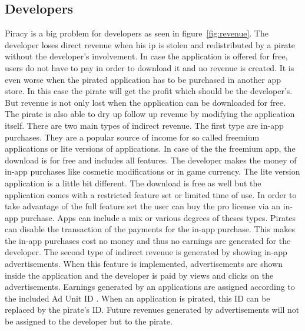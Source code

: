 \subsection{Developers} \label{subsection:foundation-piracy-developers}
Piracy is a big problem for developers as seen in figure~\ref{fig:revenue}.
The developer loses direct revenue when his \gls{ip} is stolen and redistributed by a pirate without the developer's involvement.
In case the application is offered for free, users do not have to pay in order to download it and no revenue is created.
It is even worse when the pirated application has to be purchased in another app store.
In this case the pirate will get the profit which should be the developer's.
\newline
But revenue is not only lost when the application can be downloaded for free.
The pirate is also able to dry up follow up revenue by modifying the application itself.
There are two main types of indirect revenue.
The first type are in-app purchases.
They are a popular source of income for so called freemium applications or lite versions of applications.
In case of the the freemium app, the download is for free and includes all features.
The developer makes the money of in-app purchases like cosmetic modifications or in game currency.
The lite version application is a little bit different.
The download is free as well but the application comes with a restricted feature set or limited time of use.
In order to take advantage of the full feature set the user can buy the pro license via an in-app purchase.
Apps can include a mix or various degrees of theses types.
Pirates can disable the transaction of the payments for the in-app purchase.
This makes the in-app purchases cost no money and thus no earnings are generated for the developer.
\newline
The second type of indirect revenue is generated by showing in-app advertisements.
When this feature is implemented, advertisements are shown inside the application and the developer is paid by views and clicks on the advertisements.
Earnings generated by an applications are assigned according to the included Ad Unit ID \cite{googleAdmob}.
When an application is pirated, this ID can be replaced by the pirate's ID. Future revenues generated by advertisements will not be assigned to the developer but to the pirate.
\newline
